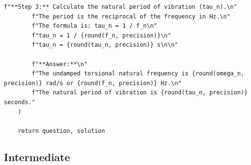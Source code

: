 \begin{lstlisting}[style=pythonstyle]
        f"**Step 3:** Calculate the natural period of vibration (tau_n).\n"
        f"The period is the reciprocal of the frequency in Hz.\n"
        f"The formula is: tau_n = 1 / f_n\n"
        f"tau_n = 1 / {round(f_n, precision)}\n"
        f"tau_n = {round(tau_n, precision)} s\n\n"

        f"**Answer:**\n"
        f"The undamped torsional natural frequency is {round(omega_n, precision)} rad/s or {round(f_n, precision)} Hz.\n"
        f"The natural period of vibration is {round(tau_n, precision)} seconds."
    )

    return question, solution
\end{lstlisting}


\vspace{6pt}

\subsection{Intermediate}

\vspace{6pt}

